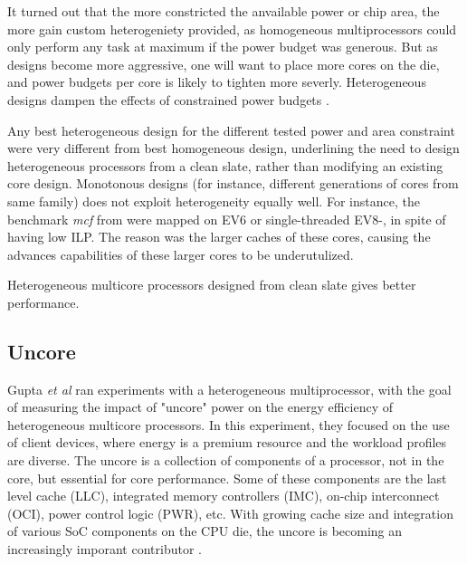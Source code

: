 
It turned out that the more constricted the anvailable power or chip area, the more gain custom heterogeniety provided, as homogeneous multiprocessors could only perform any task at maximum if the power budget was generous.
But as designs become more aggressive, one will want to place more cores on the die, and power budgets per core is likely to tighten more severly.
Heterogeneous designs dampen the effects of constrained power budgets \cite{heterogeneous-arch}.

Any best heterogeneous design for the different tested power and area constraint were very different from best homogeneous design, underlining the need to design heterogeneous processors from a clean slate, rather than modifying an existing core design.
Monotonous designs (for instance, different generations of cores from same family) does not exploit heterogeneity equally well.
For instance, the benchmark \textit{mcf} from \cite{heterogeneous-ee} were mapped on EV6 or single-threaded EV8-, in spite of having low ILP.
The reason was the larger caches of these cores, causing the advances capabilities of these larger cores to be underutulized.

Heterogeneous multicore processors designed from clean slate gives better performance.

\subsection{Uncore}
\label{subsec:rw_uncore}
Gupta \textit{et al}\cite{heterogeneous-uncore} ran experiments with a heterogeneous multiprocessor, with the goal of measuring the impact of "uncore" power on the energy efficiency of heterogeneous multicore processors.
In this experiment, they focused on the use of client devices, where energy is a premium resource and the workload profiles are diverse.
The uncore is a collection of components of a processor, not in the core, but essential for core performance.
Some of these components are the last level cache (LLC), integrated memory controllers (IMC), on-chip interconnect (OCI), power control logic (PWR), etc.
With growing cache size and integration of various SoC components on the CPU die, the uncore is becoming an increasingly imporant contributor \cite{heterogeneous-uncore}.

